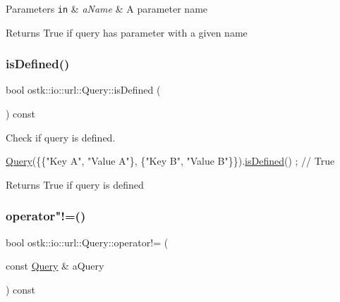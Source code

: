 \begin{DoxyParams}[1]{Parameters}
\mbox{\tt in}  & {\em a\+Name} & A parameter name \\
\hline
\end{DoxyParams}
\begin{DoxyReturn}{Returns}
True if query has parameter with a given name 
\end{DoxyReturn}
\mbox{\label{classostk_1_1io_1_1url_1_1_query_aae898ea9a490fe19a500cf33e2fc9921}} 
\subsubsection{\texorpdfstring{is\+Defined()}{isDefined()}}
{\footnotesize\ttfamily bool ostk\+::io\+::url\+::\+Query\+::is\+Defined (\begin{DoxyParamCaption}{ }\end{DoxyParamCaption}) const}



Check if query is defined. 


\begin{DoxyCode}
\hyperlink{classostk_1_1io_1_1url_1_1_query_a10299b6b445c39886d6b689c14364fe1}{Query}(\{\{\textcolor{stringliteral}{"Key A"}, \textcolor{stringliteral}{"Value A"}\}, \{\textcolor{stringliteral}{"Key B"}, \textcolor{stringliteral}{"Value B"}\}\}).\hyperlink{classostk_1_1io_1_1url_1_1_query_aae898ea9a490fe19a500cf33e2fc9921}{isDefined}() ; \textcolor{comment}{// True}
\end{DoxyCode}


\begin{DoxyReturn}{Returns}
True if query is defined 
\end{DoxyReturn}
\mbox{\label{classostk_1_1io_1_1url_1_1_query_a13c472bd1b80a7ebccec0eeaae327154}} 
\subsubsection{\texorpdfstring{operator"!=()}{operator!=()}}
{\footnotesize\ttfamily bool ostk\+::io\+::url\+::\+Query\+::operator!= (\begin{DoxyParamCaption}\item[{const \hyperlink{classostk_1_1io_1_1url_1_1_query}{Query} \&}]{a\+Query }\end{DoxyParamCaption}) const}



